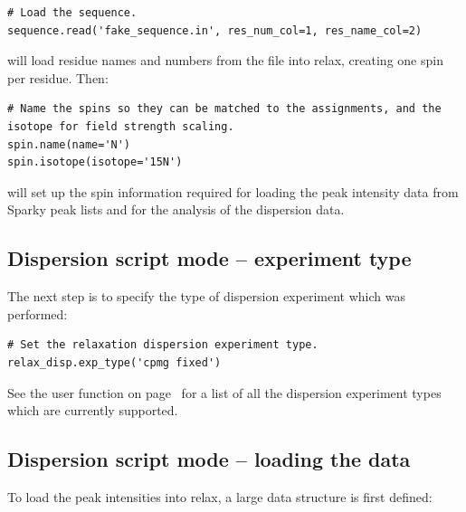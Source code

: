 \begin{lstlisting}[firstnumber=35]
# Load the sequence.
sequence.read('fake_sequence.in', res_num_col=1, res_name_col=2)
\end{lstlisting}

will load residue names and numbers from the  file into relax, creating one spin per residue.  Then:

\begin{lstlisting}[firstnumber=38]
# Name the spins so they can be matched to the assignments, and the isotope for field strength scaling.
spin.name(name='N')
spin.isotope(isotope='15N')
\end{lstlisting}

will set up the spin information required for loading the peak intensity data from Sparky peak lists and for the analysis of the dispersion data.



\subsection{Dispersion script mode -- experiment type}

The next step is to specify the type of dispersion experiment which was performed:

\begin{lstlisting}[firstnumber=42]
# Set the relaxation dispersion experiment type.
relax_disp.exp_type('cpmg fixed')
\end{lstlisting}

See the  user function on page~\pageref{uf: relax_disp.exp_type} for a list of all the dispersion experiment types which are currently supported.



\subsection{Dispersion script mode -- loading the data}

To load the peak intensities into relax, a large data structure is first defined:

